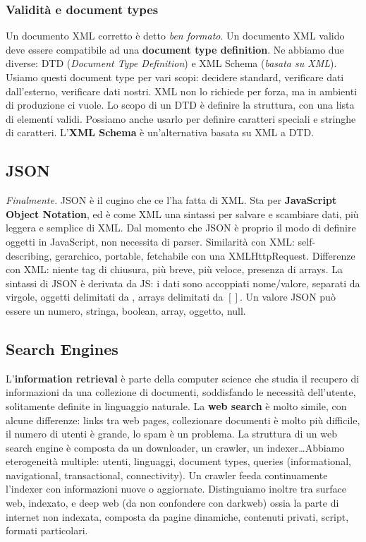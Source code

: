 \documentclass[11pt]{article}
\begin{document}
\subsubsection{Validità e document types}
Un documento XML corretto è detto \textit{ben formato}. Un documento XML valido deve essere compatibile ad una \textbf{document type definition}. Ne abbiamo due diverse: DTD (\textit{Document Type Definition}) e XML Schema (\textit{basata su XML}). Usiamo questi document type per vari scopi: decidere standard, verificare dati dall'esterno, verificare dati nostri. XML non lo richiede per forza, ma in ambienti di produzione ci vuole. Lo scopo di un DTD è definire la struttura, con una lista di elementi validi. Possiamo anche usarlo per definire caratteri speciali e stringhe di caratteri. L'\textbf{XML Schema} è un'alternativa basata su XML a DTD.

\subsection{JSON}
\textit{Finalmente.} JSON è il cugino che ce l'ha fatta di XML. Sta per \textbf{JavaScript Object Notation}, ed è come XML una sintassi per salvare e scambiare dati, più leggera e semplice di XML. Dal momento che JSON è proprio il modo di definire oggetti in JavaScript, non necessita di parser. Similarità con XML: self-describing, gerarchico, portable, fetchabile con una XMLHttpRequest. Differenze con XML: niente tag di chiusura, più breve, più veloce, presenza di arrays. La sintassi di JSON è derivata da JS: i dati sono accoppiati nome/valore, separati da virgole, oggetti delimitati da \textbraceleft\textbraceright, arrays delimitati da $[]$. Un valore JSON può essere un numero, stringa, boolean, array, oggetto, null.
\subsection{Search Engines}
L'\textbf{information retrieval} è parte della computer science che studia il recupero di informazioni da una collezione di documenti, soddisfando le necessità dell'utente, solitamente definite in linguaggio naturale. 
La \textbf{web search} è molto simile, con alcune differenze: links tra web pages, collezionare documenti è molto più difficile, il numero di utenti è grande, lo spam è un problema. La struttura di un web search engine è composta da un downloader, un crawler, un indexer\dots Abbiamo eterogeneità multiple: utenti, linguaggi, document types, queries (informational, navigational, transactional, connectivity). Un crawler feeda continuamente l'indexer con informazioni nuove o aggiornate. Distinguiamo inoltre tra surface web, indexato, e deep web (da non confondere con darkweb) ossia la parte di internet non indexata, composta da pagine dinamiche, contenuti privati, script, formati particolari. 
\end{document}
